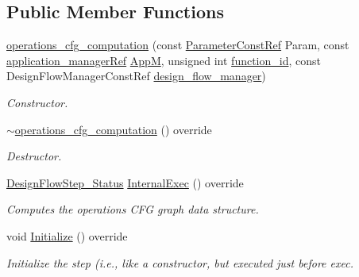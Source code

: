 \subsection*{Public Member Functions}
\begin{DoxyCompactItemize}
\item 
\hyperlink{classoperations__cfg__computation_a73fb897b367730b68b708905638fd29b}{operations\+\_\+cfg\+\_\+computation} (const \hyperlink{Parameter_8hpp_a37841774a6fcb479b597fdf8955eb4ea}{Parameter\+Const\+Ref} Param, const \hyperlink{application__manager_8hpp_a04ccad4e5ee401e8934306672082c180}{application\+\_\+manager\+Ref} \hyperlink{classFrontendFlowStep_a0ac0d8db2a378416583f51c4faa59d15}{AppM}, unsigned int \hyperlink{classFunctionFrontendFlowStep_a58ef2383ad1a212a8d3f396625a4b616}{function\+\_\+id}, const Design\+Flow\+Manager\+Const\+Ref \hyperlink{classDesignFlowStep_ab770677ddf087613add30024e16a5554}{design\+\_\+flow\+\_\+manager})
\begin{DoxyCompactList}\small\item\em Constructor. \end{DoxyCompactList}\item 
\hyperlink{classoperations__cfg__computation_ae8176a7b01ff9965351b3dc47c3cf5ad}{$\sim$operations\+\_\+cfg\+\_\+computation} () override
\begin{DoxyCompactList}\small\item\em Destructor. \end{DoxyCompactList}\item 
\hyperlink{design__flow__step_8hpp_afb1f0d73069c26076b8d31dbc8ebecdf}{Design\+Flow\+Step\+\_\+\+Status} \hyperlink{classoperations__cfg__computation_a5ab48f4fbba150d484e99c36c352bfad}{Internal\+Exec} () override
\begin{DoxyCompactList}\small\item\em Computes the operations C\+FG graph data structure. \end{DoxyCompactList}\item 
void \hyperlink{classoperations__cfg__computation_ae89b6b5ecac95fdcb9e84ee9bbf527f5}{Initialize} () override
\begin{DoxyCompactList}\small\item\em Initialize the step (i.\+e., like a constructor, but executed just before exec. \end{DoxyCompactList}\end{DoxyCompactItemize}
